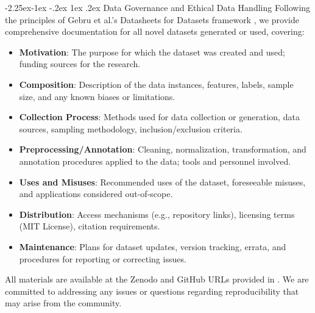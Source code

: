 \documentclass[manuscript,screen,review,anonymous,9pt]{acmart}
\makeatletter
\renewcommand\subsection{\@startsection{subsection}{2}{\z@}%
  {-2.25ex\@plus -1ex \@minus -.2ex}%
  {1ex \@plus .2ex}%
  {\normalfont\large\bfseries}}
\makeatother
\begin{document}
\subsection{Data Governance and Ethical Data Handling}
Following the principles of Gebru et al.'s Datasheets for Datasets framework \cite{Gebru2021DatasheetDatasets}, we provide comprehensive documentation for all novel datasets generated or used, covering:
\begin{itemize}[leftmargin=*,itemsep=1pt,parsep=1pt]
    \item \textbf{Motivation}: The purpose for which the dataset was created and used; funding sources for the research.
    \item \textbf{Composition}: Description of the data instances, features, labels, sample size, and any known biases or limitations.
    \item \textbf{Collection Process}: Methods used for data collection or generation, data sources, sampling methodology, inclusion/exclusion criteria.
    \item \textbf{Preprocessing/Annotation}: Cleaning, normalization, transformation, and annotation procedures applied to the data; tools and personnel involved.
    \item \textbf{Uses and Misuses}: Recommended uses of the dataset, foreseeable misuses, and applications considered out-of-scope.
    \item \textbf{Distribution}: Access mechanisms (e.g., repository links), licensing terms (MIT License), citation requirements.
    \item \textbf{Maintenance}: Plans for dataset updates, version tracking, errata, and procedures for reporting or correcting issues.
\end{itemize}
All materials are available at the Zenodo and GitHub URLs provided in . We are committed to addressing any issues or questions regarding reproducibility that may arise from the community.
\end{document}
